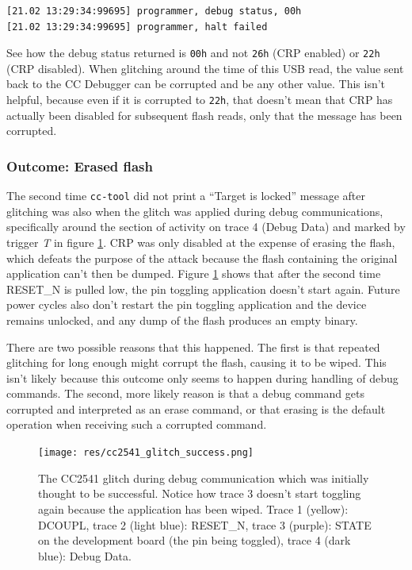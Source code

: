\begin{verbatim}
[21.02 13:29:34:99695] programmer, debug status, 00h
[21.02 13:29:34:99695] programmer, halt failed
\end{verbatim}

See how the debug status returned is \texttt{00h} and not \texttt{26h}
(CRP enabled) or \texttt{22h} (CRP disabled). When glitching around the
time of this USB read, the value sent back to the CC Debugger can be
corrupted and be any other value. This isn't helpful, because even if it
is corrupted to \texttt{22h}, that doesn't mean that CRP has actually
been disabled for subsequent flash reads, only that the message has been
corrupted.

\hypertarget{outcome-erased-flash}{%
\subsubsection{Outcome: Erased flash}\label{outcome-erased-flash}}

The second time \texttt{cc-tool} did not print a ``Target is locked''
message after glitching was also when the glitch was applied during
debug communications, specifically around the section of activity on
trace 4 (Debug Data) and marked by trigger \emph{T} in figure
\ref{img_cc2541_glitch_success}. CRP was only disabled at the expense of
erasing the flash, which defeats the purpose of the attack because the
flash containing the original application can't then be dumped. Figure
\ref{img_cc2541_glitch_success} shows that after the second time
RESET\_N is pulled low, the pin toggling application doesn't start
again. Future power cycles also don't restart the pin toggling
application and the device remains unlocked, and any dump of the flash
produces an empty binary.

There are two possible reasons that this happened. The first is that
repeated glitching for long enough might corrupt the flash, causing it
to be wiped. This isn't likely because this outcome only seems to happen
during handling of debug commands. The second, more likely reason is
that a debug command gets corrupted and interpreted as an erase command,
or that erasing is the default operation when receiving such a corrupted
command.

\begin{figure}
\centering
\texttt{[image: res/cc2541\_glitch\_success.png]}
\caption{The CC2541 glitch during debug communication which was
initially thought to be successful. Notice how trace 3 doesn't start
toggling again because the application has been wiped. Trace 1 (yellow):
DCOUPL, trace 2 (light blue): RESET\_N, trace 3 (purple): STATE on the
development board (the pin being toggled), trace 4 (dark blue): Debug
Data. \label{img_cc2541_glitch_success}}
\end{figure}

